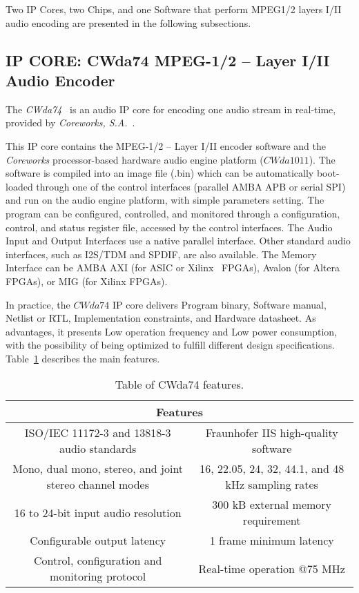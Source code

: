 Two IP Cores, two Chips, and one Software that perform MPEG1/2 layers I/II audio encoding are presented in the following subsections.

\subsection{IP CORE: CWda74 MPEG-1/2 – Layer I/II Audio Encoder}

The \textit{CWda74}~\cite{CWda74} is an audio IP core for encoding one audio stream in real-time, provided by \textit{Coreworks, S.A.}~\cite{coreworks}.

This IP core contains the MPEG-1/2 – Layer I/II encoder software and the \textit{Coreworks} processor-based hardware audio engine platform ($CWda1011$).
The software is compiled into an image file (.bin) which can be automatically boot-loaded through one of the control interfaces (parallel AMBA APB or serial SPI) and run on the audio engine platform, with simple parameters setting.
The program can be configured, controlled, and monitored through a configuration, control, and status register file, accessed by the control interfaces. The Audio Input and Output Interfaces use a native parallel interface. Other standard audio interfaces, such as I2S/TDM and SPDIF, are also available.
The Memory Interface can be AMBA AXI (for ASIC or Xilinx~\cite{xilinx} FPGAs), Avalon (for Altera~\cite{intel} FPGAs), or MIG (for Xilinx FPGAs).

In practice, the $CWda74$ IP core delivers Program binary, Software manual, Netlist or RTL, Implementation constraints, and Hardware datasheet.
As advantages, it presents Low operation frequency and Low power consumption, with the possibility of being optimized to fulfill different design specifications.
Table~\ref{tab:coreworks} describes the main features.

\begin{table}[h]
    \centering
    \begin{tabular}{|c|c|}
        \hline
        \multicolumn{2}{|c|}{\textbf{Features}} \\
        \hline
         ISO/IEC 11172-3 and 13818-3 audio standards & Fraunhofer IIS high-quality software \\
         \hline
         Mono, dual mono, stereo, and joint stereo channel modes & 16, 22.05, 24, 32, 44.1, and 48 kHz sampling rates \\
         \hline
         16 to 24-bit input audio resolution & 300 kB external memory requirement\\
         \hline
         Configurable output latency & 1 frame minimum latency\\
         \hline
         Control, configuration and monitoring protocol & Real-time operation @75 MHz \\
         \hline
    \end{tabular}
    \caption{Table of CWda74 features.}
    \label{tab:coreworks}
\end{table}

